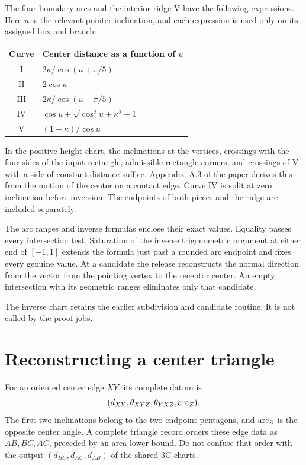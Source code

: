 \documentclass[11pt,a4paper]{article}
\newcommand{\code}[1]{\texttt{\detokenize{#1}}}
\theoremstyle{remark}\newtheorem*{contract}{Implementation contract}\newtheorem*{auditnote}{Audit note}
\begin{document}
The four boundary arcs and the interior ridge V have the following expressions. Here $u$
is the relevant pointer inclination, and each expression is used only on its
assigned box and branch:
\begin{center}
\begin{tabular}{@{}cl@{}}\toprule
Curve & Center distance as a function of $u$\\\midrule
I & $2\kappa/\cos(u+\pi/5)$\\
II & $2\cos u$\\
III & $2\kappa/\cos(u-\pi/5)$\\
IV & $\cos u+\sqrt{\cos^2u+\kappa^2-1}$\\
V & $(1+\kappa)/\cos u$\\\bottomrule
\end{tabular}
\end{center}
In the positive-height chart, the inclinations at the vertices, crossings
with the four sides of the input rectangle, admissible rectangle corners,
and crossings of V with a side of constant distance suffice.
Appendix~A.3 of the paper derives this from the motion of the center
on a contact edge. Curve IV is split at zero inclination before inversion.
The endpoints of both pieces and the ridge are included separately.



The arc ranges and inverse formulas enclose their exact values.
Equality passes every intersection test. Saturation of the inverse
trigonometric argument at either end of $[-1,1]$ extends the formula
just past a rounded arc endpoint and fixes every genuine value.
At a candidate the release reconstructs the normal direction from the
vector from the pointing vertex to the receptor center. An empty
intersection with its geometric ranges eliminates only that candidate.

The inverse chart \code{theta'_danana} retains the earlier subdivision
and candidate routine. It is not called by the proof jobs.


\section{Reconstructing a center triangle}

For an oriented center edge $XY$, its complete datum is
\[
(d_{XY},\theta_{XYZ},\theta_{YXZ},\operatorname{arc}_Z).
\]
The first two inclinations belong to the two endpoint pentagons, and
$\operatorname{arc}_Z$ is the opposite center angle. A complete triangle record orders
these edge data as $AB,BC,AC$, preceded by an area lower bound. Do not confuse
that order with the output $(d_{BC},d_{AC},d_{AB})$ of the shared 3C charts.
\end{document}
